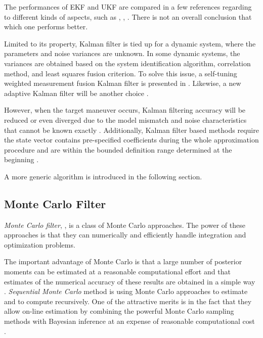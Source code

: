 The performances of EKF and UKF are compared in a few references regarding to different kinds of aspects, such as \cite{chandrasekar2007comparison}, \cite{laviola2003comparison}, \cite{st2004comparison}. There is not an overall conclusion that which one performs better. 


Limited to its property, Kalman filter is tied up for a dynamic system, where the parameters and noise variances are unknown. In some dynamic systems, the variances are obtained based on the system identification algorithm, correlation method, and least squares fusion criterion. To solve this issue, a self-tuning weighted measurement fusion Kalman filter is presented in \cite{ran2010self}. Likewise, a new adaptive Kalman filter will be another choice \cite{oussalah2001adaptive}. 


However, when the target maneuver occurs, Kalman filtering accuracy will be reduced or even diverged due to the model mismatch and noise characteristics that cannot be known exactly \cite{liu2014filtering}. Additionally, Kalman filter based methods require the state vector contains pre-specified coefficients during the whole approximation procedure and are within the bounded definition range determined at the beginning \cite{jauch2017recursive}. 

A more generic algorithm is introduced in the following section. 


\subsection*{Monte Carlo Filter}

\textit{Monte Carlo filter}, \cite{chen2003bayesian},  is a class of Monte Carlo approaches. The power of these approaches is that they can numerically and efficiently handle integration and optimization problems. 

The important advantage of Monte Carlo is that a large number of posterior moments can be estimated at a reasonable computational effort and that estimates of the numerical accuracy of these results are obtained in a simple way \cite{kloek1978bayesian}. \textit{Sequential Monte Carlo} method is using Monte Carlo approaches to estimate and to compute recursively. One of the attractive merits is in the fact that they allow on-line estimation by combining the powerful Monte Carlo sampling methods with Bayesian inference at an expense of reasonable computational cost \cite{chen2003bayesian}. 

